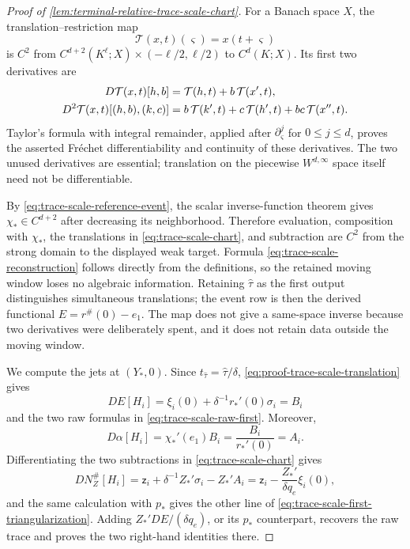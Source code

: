 \begin{proof}[Proof of
\cref{lem:terminal-relative-trace-scale-chart}]
For a Banach space \(X\), the translation--restriction map
\[
 \mathcal T(x,t)(\varsigma)=x(t+\varsigma)
\]
is \(C^2\) from
\(C^{d+2}(K^\ell;X)\times(-\ell/2,\ell/2)\) to
\(C^d(K;X)\).  Its first two derivatives are
\begin{align}
 D\mathcal T(x,t)[h,b]
 &=\mathcal T(h,t)+b\,\mathcal T(x',t),\notag\\
 D^2\mathcal T(x,t)[(h,b),(k,c)]
 &=b\,\mathcal T(k',t)+c\,\mathcal T(h',t)
       +bc\,\mathcal T(x'',t).                   \label{eq:proof-trace-scale-translation}
\end{align}
Taylor's formula with integral remainder, applied after
\(\partial_\varsigma^j\) for \(0\le j\le d\), proves the asserted
Fr\'echet differentiability and continuity of these derivatives.  The two
unused derivatives are essential; translation on the piecewise
\(W^{d,\infty}\) space itself need not be differentiable.

By \cref{eq:trace-scale-reference-event}, the scalar inverse-function
theorem gives \(\chi_*\in C^{d+2}\) after decreasing its neighborhood.
Therefore evaluation, composition with \(\chi_*\), the translations in
\cref{eq:trace-scale-chart}, and subtraction are \(C^2\) from the strong
domain to the displayed weak target.  Formula
\cref{eq:trace-scale-reconstruction} follows directly from the definitions,
so the retained moving window loses no algebraic information.  Retaining
\(\widehat\tau\) as the first output distinguishes simultaneous translations;
the event row is then the derived functional
\(E=r^\#(0)-e_1\).  The map does not give a same-space inverse because two
derivatives were deliberately spent, and it does not retain data outside the
moving window.

We compute the jets at \((Y_*,0)\).  Since
\(t_{\widehat\tau}=\widehat\tau/\delta\),
\cref{eq:proof-trace-scale-translation} gives
\[
 DE[H_i]=\xi_i(0)+\delta^{-1}r_*'(0)\sigma_i=B_i
\]
and the two raw formulas in \cref{eq:trace-scale-raw-first}.  Moreover,
\[
 D\alpha[H_i]
 =\chi_*'(e_1)B_i
 =\frac{B_i}{r_*'(0)}
 =A_i.
\]
Differentiating the two subtractions in
\cref{eq:trace-scale-chart} gives
\[
 DN_Z^\#[H_i]
 =\mathsf z_i+\delta^{-1}Z_*'\sigma_i-Z_*'A_i
 =\mathsf z_i-\frac{Z_*'}{\delta q_e}\xi_i(0),
\]
and the same calculation with \(p_*\) gives the other line of
\cref{eq:trace-scale-first-triangularization}.  Adding
\(Z_*'DE/(\delta q_e)\), or its \(p_*\) counterpart, recovers the raw
trace and proves the two right-hand identities there.


\end{proof}
